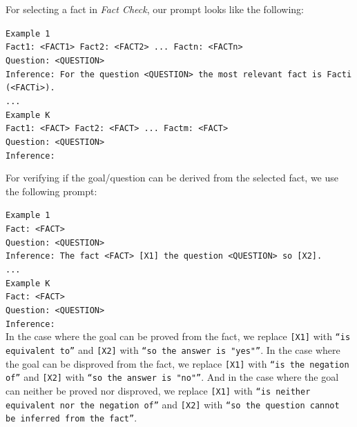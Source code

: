 \documentclass[11pt]{article}
\newcommand{\module}[1]{\emph{#1}}
\begin{document}
For selecting a fact in \module{Fact Check}, our prompt looks like the following:

\indent \texttt{Example 1}\\
\indent \texttt{Fact1: <FACT1> Fact2: <FACT2> ... Factn: <FACTn>}\\
\indent \texttt{Question: <QUESTION>}\\
\indent \texttt{Inference: For the question <QUESTION> the most relevant fact is Facti (<FACTi>).}\\
\indent \texttt{...}\\
\indent \texttt{Example K}\\
\indent \texttt{Fact1: <FACT> Fact2: <FACT> ... Factm: <FACT>}\\
\indent \texttt{Question: <QUESTION>}\\
\indent \texttt{Inference: }

For verifying if the goal/question can be derived from the selected fact, we use the following prompt:

\indent \texttt{Example 1}\\
\indent \texttt{Fact: <FACT>}\\
\indent \texttt{Question: <QUESTION>}\\
\indent \texttt{Inference: The fact <FACT> [X1] the question <QUESTION> so [X2].}\\
\indent \texttt{...}\\
\indent \texttt{Example K}\\
\indent \texttt{Fact: <FACT>}\\
\indent \texttt{Question: <QUESTION>}\\
\indent \texttt{Inference: }\\

In the case where the goal can be proved from the fact, we replace \texttt{[X1]} with \texttt{``is equivalent to''} and \texttt{[X2]} with \texttt{``so the answer is "yes"''}. In the case where the goal can be disproved from the fact, we replace \texttt{[X1]} with \texttt{``is the negation of''} and \texttt{[X2]} with \texttt{``so the answer is "no"''}. And in the case where the goal can neither be proved nor disproved, we replace \texttt{[X1]} with \texttt{``is neither equivalent nor the negation of''} and \texttt{[X2]} with \texttt{``so the question cannot be inferred from the fact''}.
\end{document}
